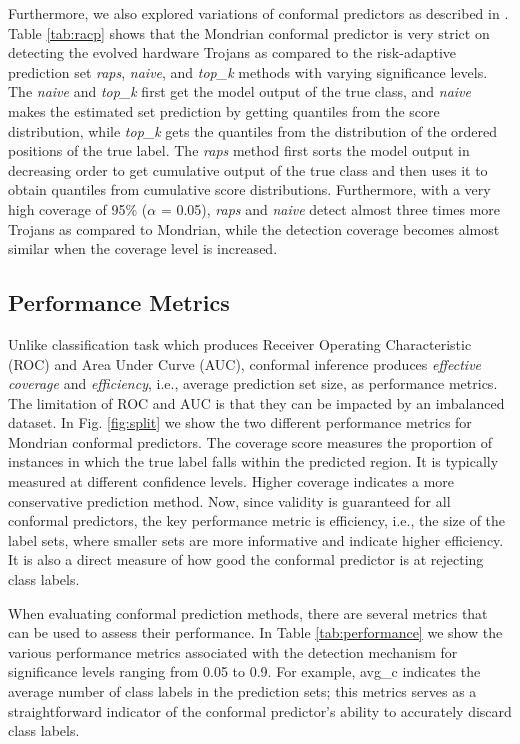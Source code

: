 Furthermore, we also explored variations of conformal predictors as described in \cite{bates2021distribution}. Table \ref{tab:racp} shows that the Mondrian conformal predictor is very strict on detecting the evolved hardware Trojans as compared to the risk-adaptive prediction set \textit{raps}, \textit{naive}, and \textit{top\_k} methods with varying significance levels. The \textit{naive} and \textit{top\_k} first get the model output of the true class, and \textit{naive} makes the estimated set prediction by getting quantiles from the score distribution, while \textit{top\_k} gets the quantiles from the distribution of the ordered positions of the true label. The \textit{raps} method first sorts the model output in decreasing order to get cumulative output of the true class and then uses it to obtain quantiles from cumulative score distributions. Furthermore, with a very high coverage of 95\% ($\alpha$ = 0.05), \textit{raps} and \textit{naive} detect almost three times more Trojans as compared to Mondrian, while the detection coverage becomes almost similar when the coverage level is increased.


\subsection*{Performance Metrics}
\label{Sec:Performance}
Unlike classification task which produces Receiver Operating Characteristic (ROC) and Area Under Curve (AUC), conformal inference produces \textit{effective coverage} and \textit{efficiency}, i.e., average prediction set size, as performance metrics. The limitation of ROC and AUC is that they can be impacted by an imbalanced dataset. In Fig. \ref{fig:split} we show the two different performance metrics for Mondrian conformal predictors. The coverage score measures the proportion of instances in which the true label falls within the predicted region. It is typically measured at different confidence levels. Higher coverage indicates a more conservative prediction method. Now, since validity is guaranteed for all conformal predictors, the key performance metric is efficiency, i.e., the size of the label sets, where smaller sets are more informative and indicate higher efficiency. It is also a direct measure of how good the conformal predictor is at rejecting class labels.

When evaluating conformal prediction methods, there are several metrics that can be used to assess their performance. In Table \ref{tab:performance} we show the various performance metrics associated with the detection mechanism for significance levels ranging from 0.05 to 0.9. For example, avg\_c indicates the average number of class labels in the prediction sets; this metrics serves as a straightforward indicator of the conformal predictor's ability to accurately discard class labels.

